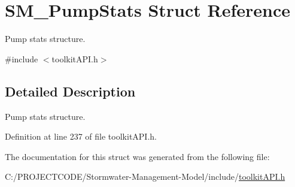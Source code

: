 \hypertarget{struct_s_m___pump_stats}{}\section{S\+M\+\_\+\+Pump\+Stats Struct Reference}
\label{struct_s_m___pump_stats}


Pump stats structure.  




{\ttfamily \#include $<$toolkit\+A\+P\+I.\+h$>$}



\subsection{Detailed Description}
Pump stats structure. 

Definition at line 237 of file toolkit\+A\+P\+I.\+h.



The documentation for this struct was generated from the following file\+:\begin{DoxyCompactItemize}
\item 
C\+:/\+P\+R\+O\+J\+E\+C\+T\+C\+O\+D\+E/\+Stormwater-\/\+Management-\/\+Model/include/\hyperlink{toolkit_a_p_i_8h}{toolkit\+A\+P\+I.\+h}\end{DoxyCompactItemize}
